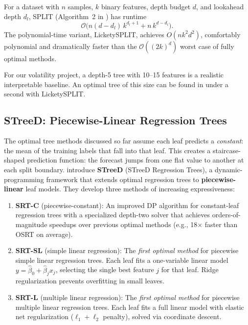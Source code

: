\begin{keyresult}
For a dataset with $n$ samples, $k$ binary features, depth budget $d$, and
lookahead depth $d_l$, SPLIT (Algorithm~2 in \citet{BabbarEtAl2025}) has
runtime
\[
  \mathcal{O}\bigl(n(d - d_l)\,k^{d_l + 1} + n\,k^{d - d_l}\bigr).
\]
The polynomial-time variant, LicketySPLIT, achieves $O(nk^2 d^2)$,
comfortably polynomial and dramatically faster than the $\mathcal{O}((2k)^d)$
worst case of fully optimal methods.
\end{keyresult}

\begin{projectconnection}
For our volatility project, a depth-5 tree with 10--15 features is a
realistic interpretable baseline.  An optimal tree of this size can be found
in under a second with LicketySPLIT.
\end{projectconnection}

\subsection{STreeD: Piecewise-Linear Regression Trees}
\label{sec:rashomon:streed}

The optimal tree methods discussed so far assume each leaf predicts a
\emph{constant}: the mean of the training labels that fall into that leaf.
This creates a staircase-shaped prediction function: the forecast jumps
from one flat value to another at each split boundary.
\citet{VanDenBosEtAl2024} introduce \textbf{STreeD} (STreeD Regression
Trees), a dynamic-programming framework that extends optimal regression
trees to \textbf{piecewise-linear} leaf models.  They develop three methods
of increasing expressiveness:

\begin{enumerate}[leftmargin=1.8em]
  \item \textbf{SRT-C} (piecewise-constant): An improved DP algorithm for
    constant-leaf regression trees with a specialized depth-two solver that
    achieves orders-of-magnitude speedups over previous optimal methods
    (e.g., 18$\times$ faster than OSRT on average).

  \item \textbf{SRT-SL} (simple linear regression): The \emph{first optimal
    method} for piecewise simple linear regression trees.  Each leaf fits a
    one-variable linear model $y = \hat{\beta}_0 + \hat{\beta}_j x_j$,
    selecting the single best feature $j$ for that leaf.  Ridge
    regularization prevents overfitting in small leaves.

  \item \textbf{SRT-L} (multiple linear regression): The \emph{first optimal
    method} for piecewise multiple linear regression trees.  Each leaf fits
    a full linear model with elastic net regularization ($\ell_1 + \ell_2$
    penalty), solved via coordinate descent.
\end{enumerate}

